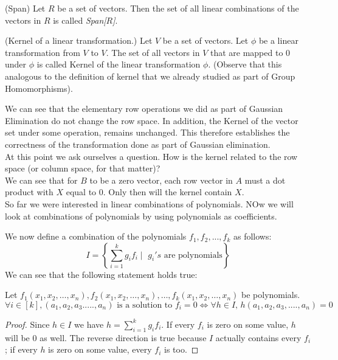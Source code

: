 \begin{definition} (Span) 
Let $R$ be a set of vectors. Then the set of all linear combinations of the vectors in $R$ is called {\em Span[$R$]}.
\end{definition}

\begin{definition} (Kernel of a linear transformation.)
Let $V$ be a set of vectors. Let $\phi$ be a linear transformation from $V$ to $V$. The set of all vectors in $V$ that are mapped to $0$ under $\phi$ is called Kernel of the linear transformation $\phi$. (Observe that this analogous to the definition of kernel that we already studied as part of Group Homomorphisms).
\end{definition}

We can see that the elementary row operations we did as part of Gaussian Elimination do not change the row space. In addition, the Kernel of the vector set under some operation, remains unchanged. This therefore establishes the correctness of the transformation done as part of Gaussian elimination.\\
At this point we ask ourselves a question. How is the kernel related to the row space (or column space, for that matter)?\\


We can see that for $B$ to be a zero vector, each row vector in $A$ must a dot product with $X$ equal to 0. Only then will the kernel contain $X$.\\


So far we were interested in linear combinations of polynomials. NOw we will look at combinations of polynomials by using polynomials as coefficients.


We now define a combination of the polynomials $f_1,f_2,...,f_k$ as follows:\\
\[
I = \left\lbrace\sum\limits_{i=1}^{k} g_{i}f_{i}\mid \text{~}g_{i}'s \text{~are polynomials}\right\rbrace
\]
We can see that the following statement holds true:
\begin{lemma}
Let $f_1(x_1, x_2, \ldots, x_n),f_2(x_1, x_2, \ldots, x_n),\ldots,
f_k (x_1, x_2, \ldots, x_n)$ be polynomials.
\begin{equation}
 \forall i\in[k], (a_1,a_2,a_3.....,a_n)\text{~is a solution to~}f_i=0 \Leftrightarrow \forall h \in I \text{,~}h(a_1,a_2,a_3,....,a_n)=0
\end{equation}
\end{lemma}
\begin{proof} 
Since $h\in I$ we have $h=\sum\limits_{i=1}^{k} g_{i}f_{i}$. If every $f_i$ is zero on some value, $h$ will be 0 as well. The reverse direction is true because $I$ actually contains every $f_i$; if every $h$ is zero on some value, every $f_i$ is too.
\end{proof}

